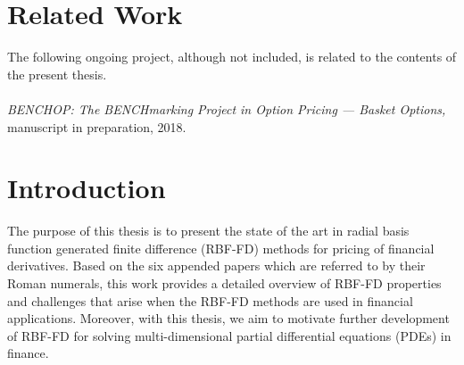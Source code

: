 \documentclass{UUThesisTemplate}
\begin{document}
    




%
\chapter*{Related Work}
    \noindent The following ongoing project, although not included, is related to the contents of the present thesis.\\\\
    \emph{BENCHOP: The BENCHmarking Project in Option Pricing --- Basket Options,}  	  
    manuscript in preparation, 2018. \label{paper7}	

    \begingroup
        \tableofcontents
    \endgroup

\mainmatter
%    
%    
%    

%    
%
%





%
\chapter{Introduction}
\label{ch:introduction}

\par
The purpose of this thesis is to present the state of the art in radial basis function generated finite difference (RBF-FD) methods for pricing of financial derivatives. Based on the six appended papers which are referred to by their Roman numerals, this work provides a detailed overview of RBF-FD properties and challenges that arise when the RBF-FD methods are used in financial applications. Moreover, with this thesis, we aim to motivate further development of RBF-FD for solving multi-dimensional partial differential equations (PDEs) in finance.
\end{document}
